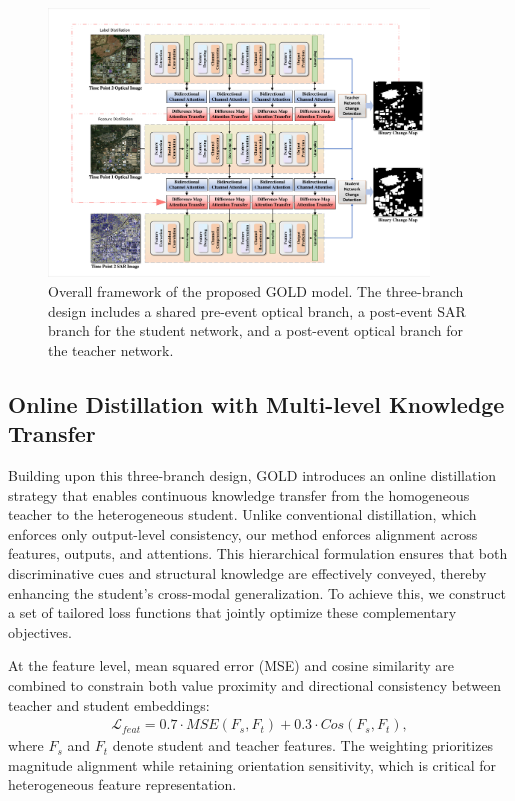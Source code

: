 \documentclass[a4paper,fleqn]{cas-dc}
\begin{document}
\begin{figure}
\centering
\includegraphics[width=0.9\textwidth]{figures/model_framework.pdf}
\caption{Overall framework of the proposed GOLD model. The three-branch design includes a shared pre-event optical branch, a post-event SAR branch for the student network, and a post-event optical branch for the teacher network.}
\label{fig:model_framework}
\end{figure}

\subsection{Online Distillation with Multi-level Knowledge Transfer}
Building upon this three-branch design, GOLD introduces an online distillation strategy that enables continuous knowledge transfer from the homogeneous teacher to the heterogeneous student. Unlike conventional distillation, which enforces only output-level consistency, our method enforces alignment across features, outputs, and attentions. This hierarchical formulation ensures that both discriminative cues and structural knowledge are effectively conveyed, thereby enhancing the student’s cross-modal generalization. To achieve this, we construct a set of tailored loss functions that jointly optimize these complementary objectives.    

At the feature level, mean squared error (MSE) and cosine similarity are combined to constrain both value proximity and directional consistency between teacher and student embeddings:
\begin{align}
\mathcal{L}_{feat} = 0.7 \cdot MSE(F_s,F_t) + 0.3 \cdot Cos(F_s,F_t),
\end{align}
where $F_s$ and $F_t$ denote student and teacher features. The weighting prioritizes magnitude alignment while retaining orientation sensitivity, which is critical for heterogeneous feature representation.  
\end{document}
